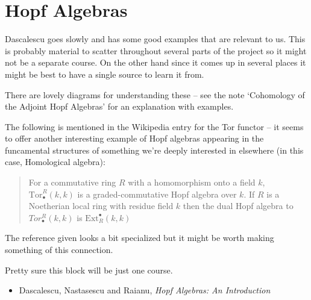 \documentclass[article]{article}
\begin{document}
\section{Hopf Algebras}

Dascalescu goes slowly and has some good examples that are relevant to us. This is probably material to scatter throughout several parts of the project so it might not be a separate course. On the other hand since it comes up in several places it might be best to have a single source to learn it from.

There are lovely diagrams for understanding these -- see the note `Cohomology of the Adjoint Hopf Algebras' for an explanation with examples.

The following is mentioned in the Wikipedia entry for the Tor functor -- it seems to offer another interesting example of Hopf algebras appearing in the funcamental structures of something we're deeply interested in elsewhere (in this case, Homological algebra):
\begin{quote}
	For a commutative ring $R$ with a homomorphism onto a field $k$, $\text{Tor}_\bullet^R(k, k)$ is a graded-commutative Hopf algebra over $k$. If $R$ is a Noetherian local ring with residue field $k$ then the dual Hopf algebra to $Tor_\bullet^R(k,k)$ is $\text{Ext}^\bullet_R(k, k)$
\end{quote}
The reference given looks a bit specialized but it might be worth making something of this connection.

Pretty sure this block will be just one course.

\begin{itemize}
	\item[]{Dascalescu, Nastasescu and Raianu, \textit{Hopf Algebras: An Introduction}}
\end{itemize}
\end{document}
